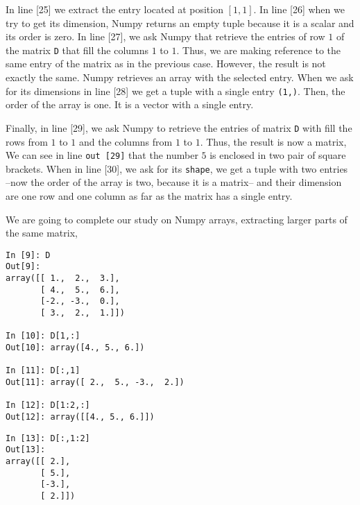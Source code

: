 \begin{paracol}{2}
 In line [25] we extract the entry located at position $[1,1]$. In line [26] when we try to get its dimension, Numpy returns an empty tuple because it is a scalar and its order is zero. In line [27], we ask Numpy that retrieve the entries of row $1$ of the matrix \texttt{D} that fill the columns $1$ to $1$. Thus, we are making reference to the same entry of the matrix as in the previous case. However, the result is not exactly the same. Numpy retrieves an array with the selected entry. When we ask for its dimensions in line [28] we get a tuple with a single entry \texttt{(1,)}. Then, the order of the array is one. It is a vector with a single entry.

 Finally, in line [29], we ask Numpy to retrieve the entries of matrix \texttt{D} with fill the rows from $1$ to $1$ and the columns from $1$ to $1$. Thus, the result is now a matrix, We can see in line \texttt{out [29]} that the number $5$ is enclosed in two pair of square brackets. When in line [30], we ask for its \texttt{shape}, we get a tuple with two entries  --now the order of the array is two, because it is a matrix-- and their dimension are one row and one column as far as the matrix has a single entry.

 We are going to complete our study on Numpy arrays, extracting larger parts of the same matrix, 
 \end{paracol}
\begin{center}
 \begin{minipage}{0.3\textwidth}
    \begin{verbatim}
In [9]: D
Out[9]: 
array([[ 1.,  2.,  3.],
       [ 4.,  5.,  6.],
       [-2., -3.,  0.],
       [ 3.,  2.,  1.]])

In [10]: D[1,:]
Out[10]: array([4., 5., 6.])

In [11]: D[:,1]
Out[11]: array([ 2.,  5., -3.,  2.])
    
In [12]: D[1:2,:]
Out[12]: array([[4., 5., 6.]])
\end{verbatim}
\end{minipage}
\end{center}
\begin{center}
 \begin{minipage}{0.3\textwidth}
    \begin{verbatim}
In [13]: D[:,1:2]
Out[13]: 
array([[ 2.],
       [ 5.],
       [-3.],
       [ 2.]])
    \end{verbatim}
\end{minipage}
\end{center}
